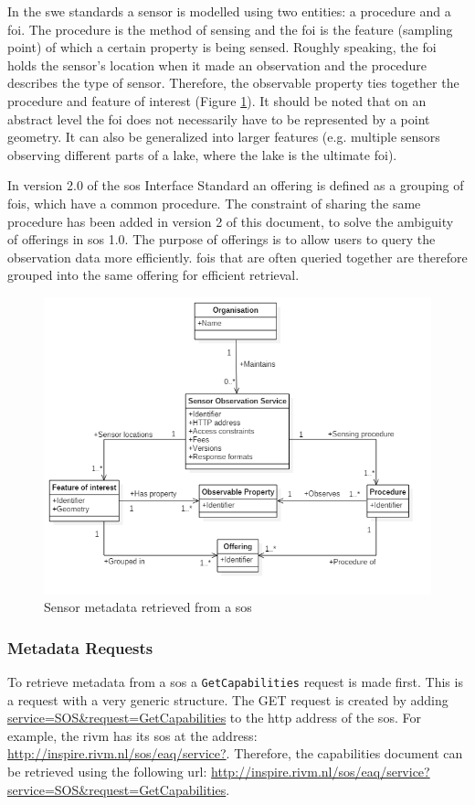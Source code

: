 In the \ac{swe} standards a sensor is modelled using two entities: a procedure and a \acf{foi}. The procedure is the method of sensing and the \ac{foi} is the feature (sampling point) of which a certain property is being sensed. Roughly speaking, the \ac{foi} holds the sensor's location when it made an observation and the procedure describes the type of sensor. Therefore, the observable property ties together the procedure and feature of interest (Figure \ref{fig:SOS_UML}). It should be noted that on an abstract level the \ac{foi} does not necessarily have to be represented by a point geometry. It can also be generalized into larger features (e.g. multiple sensors observing different parts of a lake, where the lake is the ultimate \ac{foi}). 

In version 2.0 of the \acl{sos} Interface Standard \citep{SW:OGC2} an offering is defined as a grouping of \acp{foi}, which have a common procedure. The constraint of sharing the same procedure has been added in version 2 of this document, to solve the ambiguity of offerings in \ac{sos} 1.0. The purpose of offerings is to allow users to query the observation data more efficiently. \acp{foi} that are often queried together are therefore grouped into the same offering for efficient retrieval.        

\begin{figure}
	\centering
	\includegraphics[width=\linewidth]{UML/SOS_UML.PNG}
	\caption{Sensor metadata retrieved from a \ac{sos}}
	\label{fig:SOS_UML}
\end{figure}

\subsubsection{Metadata Requests}
\label{par:metadataRequests}
To retrieve metadata from a \ac{sos} a \texttt{GetCapabilities} request is made first. This is a request with a very generic structure. The GET request is created by adding \url{service=SOS\&request=GetCapabilities} to the \ac{http} address of the \ac{sos}. For example, the \ac{rivm} has its \ac{sos} at the address: \url{http://inspire.rivm.nl/sos/eaq/service?}. Therefore, the capabilities document can be retrieved using the following \ac{url}: \url{http://inspire.rivm.nl/sos/eaq/service?service=SOS&request=GetCapabilities}. 

